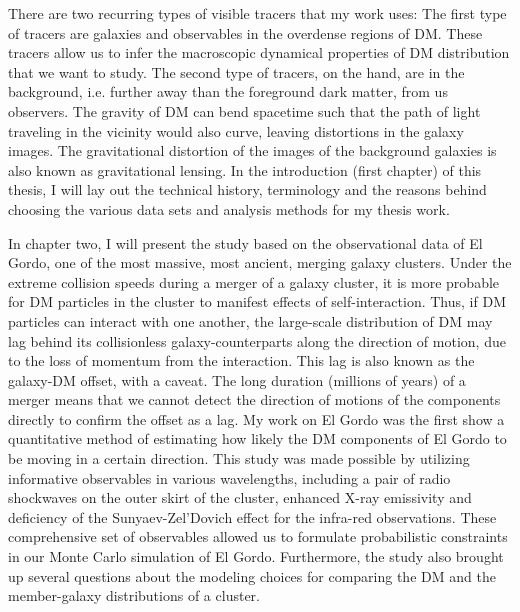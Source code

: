 \documentclass[ucdthesis.tex]{subfiles}
\begin{document}
		There are two recurring types of visible tracers that 
		my work uses: The first type of tracers are galaxies and observables in the 
		 overdense regions of DM. These tracers allow 
		us to infer the macroscopic dynamical properties of DM distribution that we want to study. The
		second type of tracers, on the hand, are in the background, i.e.
		further away than the foreground dark matter, from us observers. The
		gravity of DM can bend spacetime such that the path of light traveling in 
		the vicinity would also curve, leaving distortions in the galaxy images. 
		The gravitational distortion of the images 
		of the background galaxies is also known as gravitational lensing. In the
		introduction (first chapter) of this thesis, I will lay out the technical
		history, terminology and the reasons behind choosing the various data sets
		and analysis methods for my thesis work. 
		
			In chapter two, I will present the study based on the observational data 
			of El Gordo, one of the most massive, most ancient, merging galaxy clusters. 
		Under the extreme collision speeds during a merger of a galaxy cluster, 
		it is more probable for DM particles in the cluster to manifest effects of
		self-interaction. Thus, if DM particles can interact with one another, 		
		the large-scale distribution of DM may lag behind
		its collisionless galaxy-counterparts along the direction of motion, due to
		the loss of momentum from the interaction. This
		lag is also known as the galaxy-DM offset, with a caveat. The long duration 
		(millions of years) 
		of a merger means that we cannot detect the
		direction of motions of the components directly to confirm the offset as
		a lag. My work on El Gordo was the first show a quantitative method of estimating
		how likely the DM components of El Gordo to be moving in a certain
		direction.	This study was made possible by utilizing informative
		observables in various wavelengths, including a pair of radio shockwaves on
		the outer skirt of the cluster, enhanced X-ray emissivity and deficiency of the
		Sunyaev-Zel'Dovich effect for the infra-red observations.
		These comprehensive set of observables allowed us to formulate 
		probabilistic constraints in our Monte Carlo simulation of El Gordo.
		Furthermore, the study also brought up several questions about the modeling
		choices for comparing the DM and the member-galaxy distributions of a cluster.
		
\end{document}
